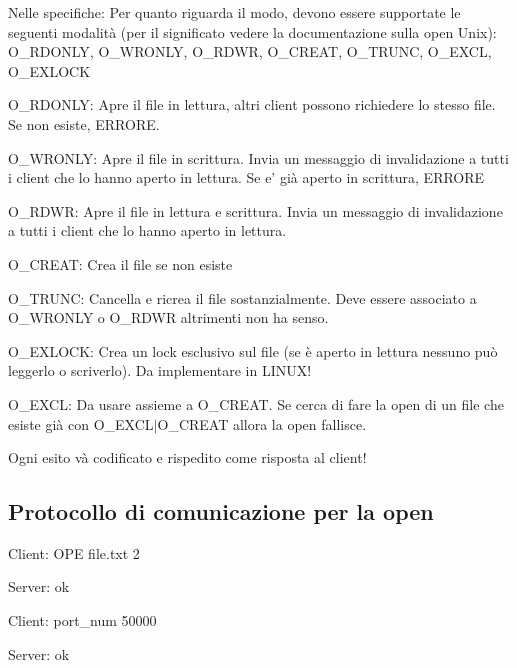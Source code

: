 Nelle specifiche\+: Per quanto riguarda il modo, devono essere supportate le seguenti modalità (per il significato vedere la documentazione sulla open Unix)\+: O\+\_\+\+R\+D\+O\+N\+L\+Y, O\+\_\+\+W\+R\+O\+N\+L\+Y, O\+\_\+\+R\+D\+W\+R, O\+\_\+\+C\+R\+E\+A\+T, O\+\_\+\+T\+R\+U\+N\+C, O\+\_\+\+E\+X\+C\+L, O\+\_\+\+E\+X\+L\+O\+C\+K


\begin{DoxyItemize}
\item O\+\_\+\+R\+D\+O\+N\+L\+Y\+: Apre il file in lettura, altri client possono richiedere lo stesso file. Se non esiste, E\+R\+R\+O\+R\+E.
\item O\+\_\+\+W\+R\+O\+N\+L\+Y\+: Apre il file in scrittura. Invia un messaggio di invalidazione a tutti i client che lo hanno aperto in lettura. Se e' già aperto in scrittura, E\+R\+R\+O\+R\+E
\item O\+\_\+\+R\+D\+W\+R\+: Apre il file in lettura e scrittura. Invia un messaggio di invalidazione a tutti i client che lo hanno aperto in lettura.
\item O\+\_\+\+C\+R\+E\+A\+T\+: Crea il file se non esiste
\item O\+\_\+\+T\+R\+U\+N\+C\+: Cancella e ricrea il file sostanzialmente. Deve essere associato a O\+\_\+\+W\+R\+O\+N\+L\+Y o O\+\_\+\+R\+D\+W\+R altrimenti non ha senso.
\item O\+\_\+\+E\+X\+L\+O\+C\+K\+: Crea un lock esclusivo sul file (se è aperto in lettura nessuno può leggerlo o scriverlo). Da implementare in L\+I\+N\+U\+X!
\item O\+\_\+\+E\+X\+C\+L\+: Da usare assieme a O\+\_\+\+C\+R\+E\+A\+T. Se cerca di fare la open di un file che esiste già con O\+\_\+\+E\+X\+C\+L$\vert$\+O\+\_\+\+C\+R\+E\+A\+T allora la open fallisce.
\end{DoxyItemize}

Ogni esito và codificato e rispedito come risposta al client! 

 \subsection*{Protocollo di comunicazione per la open}


\begin{DoxyEnumerate}
\item Client\+: O\+P\+E file.\+txt 2
\item Server\+: ok
\item Client\+: port\+\_\+num 50000
\item Server\+: ok 
\end{DoxyEnumerate}